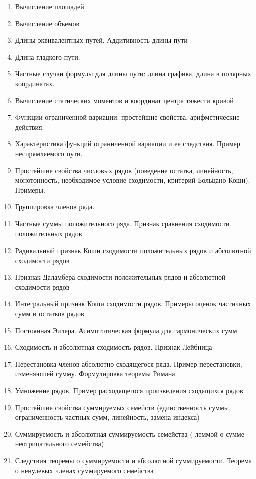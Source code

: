 \documentclass[12pt, a4paper]{article}
\begin{document}
\begin{enumerate}
    \item Вычисление площадей
    \item Вычисление объемов
    \item Длины эквивалентных путей. Аддитивность длины пути
    \item Длина гладкого пути.
    \item Частные случаи формулы для длины пути: длина графика, длина в полярных координатах.
    \item Вычисление статических моментов и координат центра тяжести кривой
    \item Функции ограниченной вариации: простейшие свойства, арифметические действия. 
    \item Характеристика функций ограниченной вариации и ее следствия. Пример неспрямляемого пути.
    \item Простейшие свойства числовых рядов (поведение остатка, линейность, монотонность, необходимое условие сходимости, критерий Больцано-Коши). Примеры.
    \item Группировка членов ряда.
    \item Частные суммы положительного ряда. Признак сравнения сходимости положительных рядов
    \item Радикальный признак Коши сходимости положительных рядов и абсолютной сходимости рядов
    \item Признак Даламбера сходимости положительных рядов и абсолютной сходимости рядов
    \item Интегральный признак Коши сходимости рядов. Примеры оценок частичных сумм и остатков рядов
    \item Постоянная Эилера. Асимптотическая формула для гармонических сумм
    \item Сходимость и абсолютная сходимость рядов. Признак Лейбница
    \item Перестановка членов абсолютно сходящегося ряда. Пример перестановки, изменяюшей сумму. Формулировка теоремы Римана
    \item Умножение рядов. Пример расходящегося произведения сходящихся рядов
    \item Простейшие свойства суммируемых семейств (единственность суммы, ограниченность частных сумм, линейность, замена индекса)
    \item Суммируемость и абсолютная суммируемость семейства ( леммой о сумме неотрицательного семейства)
    \item Следствия теоремы о суммируемости и абсолютной суммируемости. Теорема о ненулевых членах суммируемого семейства

\end{enumerate}
\end{document}
